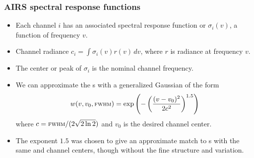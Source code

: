 \documentclass[10pt]{beamer}
\begin{document}
\begin{frame}
\frametitle{AIRS spectral response functions}
\begin{itemize}

  \item Each {\airs} channel $i$ has an associated spectral response
    function or {\srf} $\sigma_i(v)$, a function of frequency $v$.

  \item Channel radiance $c_i = \int \sigma_i(v)r(v)\,dv$, where $r$
    is radiance at frequency $v$.

  \item The center or peak of $\sigma_i$ is the nominal channel
    frequency.

  \item We can approximate the {\airs} {\srf}s with a generalized
    Gaussian of the form \[w(v, v_0, \mbox{\small\textsc{fwhm}}) =
    \exp\left(-\left(\frac{(v - v_0)^2}{2c^2}\right)^{1.5}\right) \]
    where $c=\mbox{\small\textsc{fwhm}} / (2\sqrt{2\ln 2})$ and $v_0$ is the desired
    channel center.

  \item The exponent $1.5$ was chosen to give an approximate match
    to {\airs} {\srf}s with the same {\FWHM} and channel centers,
    though without the fine structure and variation.

\end{itemize}
\end{frame}
\end{document}
